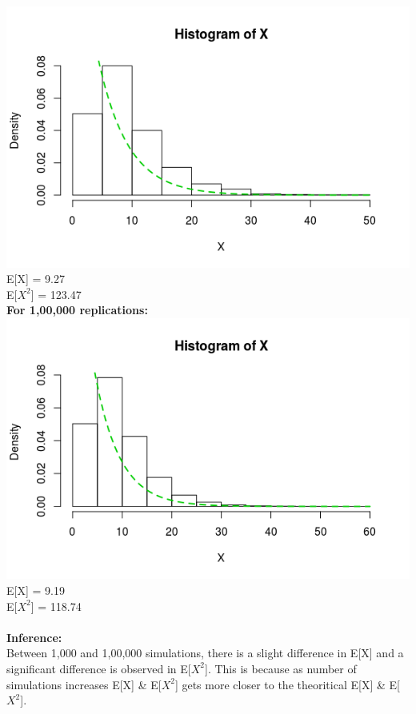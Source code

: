 \documentclass[12pt,a4paper]{report}
\begin{document}
\includegraphics[scale=0.8]{1.png}\\
E[X] = 9.27\\
E[$X^2$] = 123.47\\

\textbf{For 1,00,000 replications:}\\

\includegraphics[scale=0.8]{2.png}\\
E[X] = 9.19\\
E[$X^2$] = 118.74\\
\\
\textbf{Inference:}\\

Between 1,000 and 1,00,000 simulations, there is a slight difference in E[X] and a significant difference is observed in E[$X^2$]. This is because as number of simulations increases E[X] \& E[$X^2$] gets more closer to the theoritical E[X] \& E[$X^2$].
\end{document}
